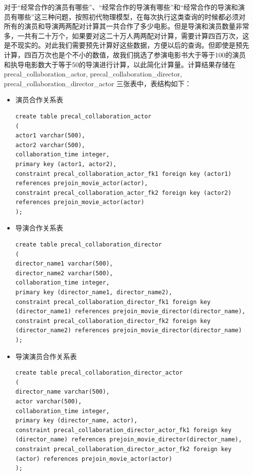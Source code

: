 \documentclass{ctexrep}
\begin{document}
\begin{enumerate}
        对于“经常合作的演员有哪些”、“经常合作的导演有哪些”和“经常合作的导演和演员有哪些”这三种问题，按照初代物理模型，在每次执行这类查询的时候都必须对所有的演员和导演两两配对计算其一共合作了多少电影。但是导演和演员数量非常多，一共有二十万个，如果要对这二十万人两两配对计算，需要计算四百万次，这是不现实的。对此我们需要预先计算好这些数据，方便以后的查询。但即使是预先计算，四百万次也是个不小的数值，故我们挑选了参演电影书大于等于100的演员和执导电影数大于等于50的导演进行计算，以此简化计算量。计算结果存储在 precal\_collaboration\_actor, precal\_collaboration\_director, precal\_collaboration\_director\_actor 三张表中，表结构如下：
        \begin{itemize}
            \item 演员合作关系表
                \begin{lstlisting}
create table precal_collaboration_actor
(
actor1 varchar(500),
actor2 varchar(500),
collaboration_time integer,
primary key (actor1, actor2),
constraint precal_collaboration_actor_fk1 foreign key (actor1) references prejoin_movie_actor(actor),
constraint precal_collaboration_actor_fk2 foreign key (actor2) references prejoin_movie_actor(actor)
);
                \end{lstlisting}
            \item 导演合作关系表
                \begin{lstlisting}
create table precal_collaboration_director
(
director_name1 varchar(500),
director_name2 varchar(500),
collaboration_time integer,
primary key (director_name1, director_name2),
constraint precal_collaboration_director_fk1 foreign key (director_name1) references prejoin_movie_director(director_name),
constraint precal_collaboration_director_fk2 foreign key (director_name2) references prejoin_movie_director(director_name)
);
                \end{lstlisting}
            \item 导演演员合作关系表
                \begin{lstlisting}
create table precal_collaboration_director_actor
(
director_name varchar(500),
actor varchar(500),
collaboration_time integer,
primary key (director_name, actor),
constraint precal_collaboration_director_actor_fk1 foreign key (director_name) references prejoin_movie_director(director_name),
constraint precal_collaboration_director_actor_fk2 foreign key (actor) references prejoin_movie_actor(actor)
);
                \end{lstlisting}
        \end{itemize}

\end{enumerate}
\end{document}
